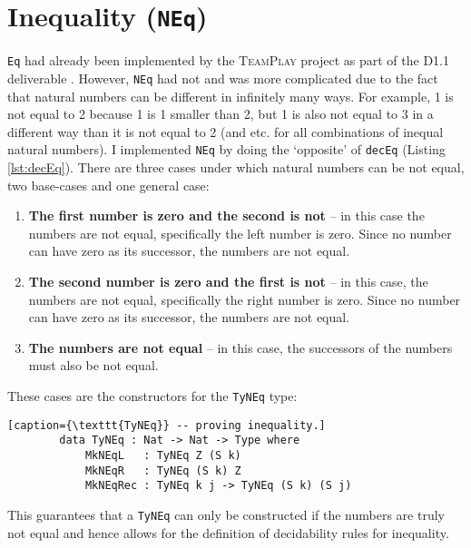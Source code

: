 \section{Inequality (\texttt{NEq})}
    \texttt{Eq} had already been implemented by the \textsc{TeamPlay} project as part of the D1.1 deliverable \cite{teamplay:d1.1}. However, \texttt{NEq} had not and was more complicated due to the fact that natural numbers can be different in infinitely many ways. For example, 1 is not equal to 2 because 1 is 1 smaller than 2, but 1 is also not equal to 3 in a different way than it is not equal to 2 (and etc. for all combinations of inequal natural numbers). I implemented \texttt{NEq} by doing the `opposite' of \texttt{decEq} (Listing \ref{lst:decEq}). There are three cases under which natural numbers can be not equal, two base-cases and one general case:
    \begin{enumerate}
        \item \textbf{The first number is zero and the second is not} -- in this case the numbers are not equal, specifically the left number is zero. Since no number can have zero as its successor, the numbers are not equal.
        \item \textbf{The second number is zero and the first is not} -- in this case, the numbers are not equal, specifically the right number is zero. Since no number can have zero as its successor, the numbers are not equal.
        \item \textbf{The numbers are not equal} -- in this case, the successors of the numbers must also be not equal.
    \end{enumerate}
    These cases are the constructors for the \texttt{TyNEq} type:
    \begin{lstlisting}[caption={\texttt{TyNEq}} -- proving inequality.]
        data TyNEq : Nat -> Nat -> Type where
            MkNEqL   : TyNEq Z (S k)
            MkNEqR   : TyNEq (S k) Z
            MkNEqRec : TyNEq k j -> TyNEq (S k) (S j)
    \end{lstlisting}
    This guarantees that a \texttt{TyNEq} can only be constructed if the numbers are truly not equal and hence allows for the definition of decidability rules for inequality.
